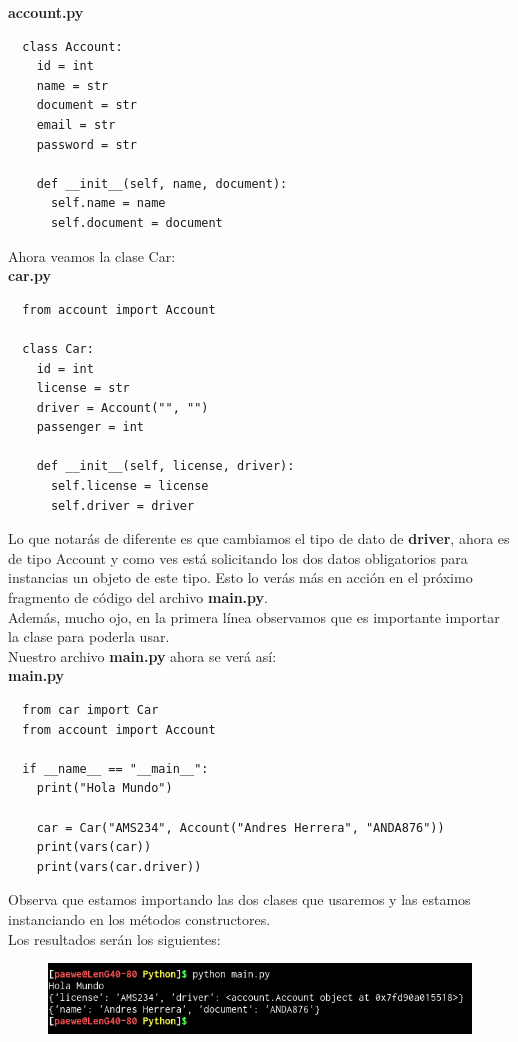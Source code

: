 \documentclass{article}
\begin{document}
\textbf{account.py}
\begin{verbatim}
  class Account:
    id = int
    name = str
    document = str
    email = str
    password = str

    def __init__(self, name, document):
      self.name = name
      self.document = document
\end{verbatim}

Ahora veamos la clase Car:\\

\textbf{car.py}
\begin{verbatim}
  from account import Account

  class Car:
    id = int
    license = str
    driver = Account("", "")
    passenger = int

    def __init__(self, license, driver):
      self.license = license
      self.driver = driver
\end{verbatim}

Lo que notarás de diferente es que cambiamos el tipo de dato de
\textbf{driver}, ahora es de tipo Account y como ves está solicitando los dos
datos obligatorios para instancias un objeto de este tipo. Esto lo verás más en
acción en el próximo fragmento de código del archivo \textbf{main.py}.\\
Además, mucho ojo, en la primera línea observamos que es importante importar la
clase para poderla usar.\\

Nuestro archivo \textbf{main.py} ahora se verá así:\\

\textbf{main.py}
\begin{verbatim}
  from car import Car
  from account import Account

  if __name__ == "__main__":
    print("Hola Mundo")

    car = Car("AMS234", Account("Andres Herrera", "ANDA876"))
    print(vars(car))
    print(vars(car.driver))
\end{verbatim}

Observa que estamos importando las dos clases que usaremos y las estamos
instanciando en los métodos constructores.\\

Los resultados serán los siguientes:

\begin{figure}[h!]
  \centering
  \includegraphics[scale=0.75]{./Pictures/018_resultado_python.png}
\end{figure}
\end{document}
